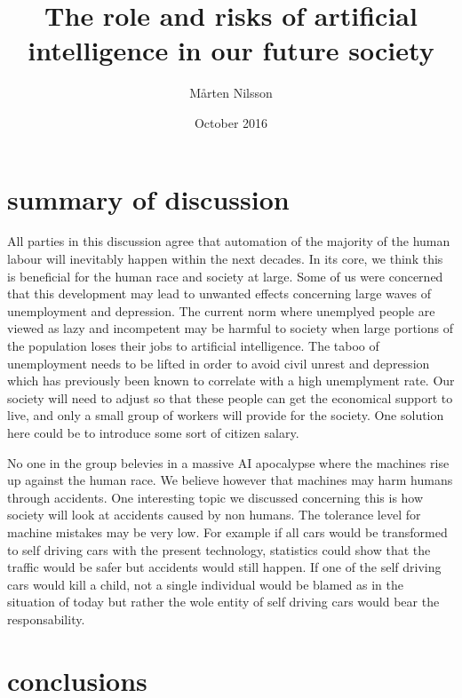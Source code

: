 \documentclass{article}
\title{ The role and risks of artificial intelligence in our future society }
\author{ Mårten Nilsson }
\date{October 2016}
\begin{document}
\maketitle

\thispagestyle{empty}

\section{summary of discussion}
All parties in this discussion agree that automation of the majority of the human labour will inevitably happen within the next decades. In its core, we think this is beneficial for the human race and society at large. Some of us were concerned that this development may lead to unwanted effects concerning large waves of unemployment and depression. The current norm where unemplyed people are viewed as lazy and incompetent may be harmful to society when large portions of the population loses their jobs to artificial intelligence. The taboo of unemployment needs to be lifted in order to avoid civil unrest and depression which has previously been known to correlate with a high unemplyment rate. Our society will need to adjust so that these people can get the economical support to live, and only a small group of workers will provide for the society. One solution here could be to introduce some sort of citizen salary. 

No one in the group belevies in a massive AI apocalypse where the machines rise up against the human race. We believe however that machines may harm humans through accidents. One interesting topic we discussed concerning this is how society will look at accidents caused by non humans. The tolerance level for machine mistakes may be very low. For example if all cars would be transformed to self driving cars with the present technology, statistics could show that the traffic would be safer but accidents would still happen. If one of the self driving cars would kill a child, not a single individual would be blamed as in the situation of today but rather the wole entity of self driving cars would bear the responsability. 


\section{conclusions}
\end{document}
